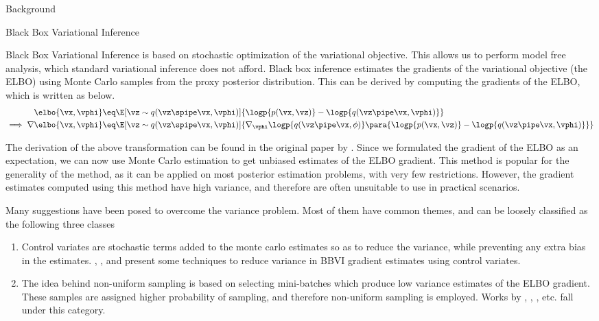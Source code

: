 \documentclass{article}
\begin{document}
\begin{psection}{Background}

	\begin{psubsection}{Black Box Variational Inference}

		Black Box Variational Inference \citep{bbvi} is based on stochastic optimization of the variational objective. This allows us to perform model free analysis, which standard variational inference does not afford. Black box inference estimates the gradients of the variational objective (the ELBO) using Monte Carlo samples from the proxy posterior distribution. This can be derived by computing the gradients of the ELBO, which is written as below.
		\begin{align}
			\elbo{\vx, \vphi}	&\eq \E[\vz \sim q(\vz \spipe \vx, \vphi)]{\logp{p(\vx, \vz)} - \logp{q(\vz \pipe \vx, \vphi)}} \\
			\implies \nabla \elbo{\vx, \vphi} &\eq \E[\vz \sim q(\vz \spipe \vx, \vphi)]{\nabla_\vphi \logp{q(\vz \pipe \vx, \phi)} \para{\logp{p(\vx, \vz)} - \logp{q(\vz \pipe \vx, \vphi)}}} \label{eq:score-function}
		\end{align}

		The derivation of the above transformation can be found in the original paper by \cite{bbvi}. Since we formulated the gradient of the ELBO as an expectation, we can now use Monte Carlo estimation to get unbiased estimates of the ELBO gradient. This method is popular for the generality of the method, as it can be applied on most posterior estimation problems, with very few restrictions. However, the gradient estimates computed using this method have high variance, and therefore are often unsuitable to use in practical scenarios.

		Many suggestions have been posed to overcome the variance problem. Most of them have common themes, and can be loosely classified as the following three classes
		\begin{enumerate}
			\item {} Control variates are stochastic terms added to the monte carlo estimates so as to reduce the variance, while preventing any extra bias in the estimates. \cite{cv-johnson}, \cite{cv-paisley}, \cite{cv-chong} and \cite{bbvi} present some techniques to reduce variance in BBVI gradient estimates using control variates.

			\item {} The idea behind non-uniform sampling is based on selecting mini-batches which produce low variance estimates of the ELBO gradient. These samples are assigned higher probability of sampling, and therefore non-uniform sampling is employed. Works by \cite{nus-dominik}, \cite{nus-prem}, \cite{nus-volkan}, etc. fall under this category.


\end{enumerate}
\end{psubsection}
\end{psection}
\end{document}
